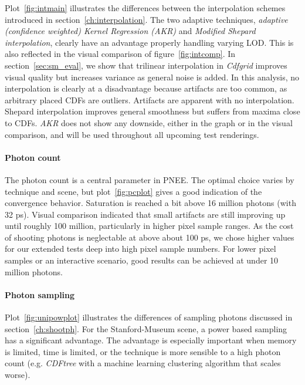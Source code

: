 Plot~\ref{fig:intmain} illustrates the differences between the interpolation schemes introduced in section~\ref{ch:interpolation}. The two adaptive techniques, \textit{adaptive (confidence weighted) Kernel Regression (AKR)} and \textit{Modified Shepard interpolation}, clearly have an advantage properly handling varying LOD. This is also reflected in the visual comparison of figure~\ref{fig:intcomp}. In section~\ref{sec:sm_eval}, we show that trilinear interpolation in \textit{Cdfgrid} improves visual quality but increases variance as general noise is added. In this analysis, no interpolation is clearly at a disadvantage because artifacts are too common, as arbitrary placed CDFs are outliers. Artifacts are apparent with no interpolation. Shepard interpolation improves general smoothness but suffers from maxima close to CDFs. \textit{AKR} does not show any downside, either in the graph or in the visual comparison, and will be used throughout all upcoming test renderings.

\paragraph{Photon count}

The photon count is a central parameter in PNEE. The optimal choice varies by technique and scene, but plot~\ref{fig:pcplot} gives a good indication of the convergence behavior. Saturation is reached a bit above 16 million photons (with 32 ps). Visual comparison indicated that small artifacts are still improving up until roughly 100 million, particularly in higher pixel sample ranges. As the cost of shooting photons is neglectable at above about 100 ps, we chose higher values for our extended tests deep into high pixel sample numbers. For lower pixel samples or an interactive scenario, good results can be achieved at under 10 million photons.

\paragraph{Photon sampling}
\label{ch:ev:photonsampling}

Plot~\ref{fig:unipowplot} illustrates the differences of sampling photons discussed in section~\ref{ch:shootph}. For the Stanford-Museum scene, a power based sampling has a significant advantage. The advantage is especially important when memory is limited, time is limited, or the technique is more sensible to a high photon count (e.g. \textit{CDFtree} with a machine learning clustering algorithm that scales worse).  

